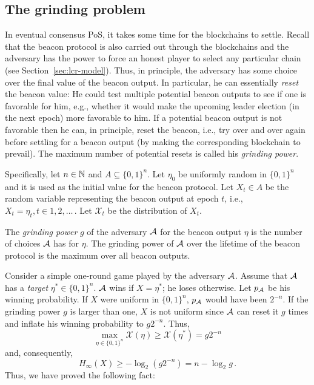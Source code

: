\subsection{The grinding problem}
In eventual consensus PoS, 
it takes some time for the blockchains to settle. 
Recall that the beacon protocol is also carried out through the blockchains 
and the adversary has the power to force an honest player 
to select any particular chain (see Section~\ref{sec:lcr-model}).
Thus, in principle, 
the adversary has some choice over the final value of the beacon output.
In particular, he can essentially \emph{reset} the beacon value: 
He could test multiple potential beacon outputs to see if one is favorable for him, 
e.g., whether it would make the upcoming leader election (in the next epoch) 
more favorable to him. 
If a potential beacon output is not favorable then he can, in principle, reset the beacon, 
i.e., try over and over again before settling for a beacon output 
(by making the corresponding blockchain to prevail). 
The maximum number of potential resets is called his \emph{grinding power}.

Specifically, let $n \in \mathbb{N}$ and $A \subseteq \{0,1\}^n$.
Let $\eta_0$ be uniformly random in $\{0,1\}^n$ 
and it is used as the initial value for the beacon protocol. 
Let $X_t \in A$ be the random variable 
representing the beacon output at epoch $t$, 
i.e., $X_t = \eta_t, t \in 1, 2, \ldots$\,. 
Let $\mathcal{X}_t$ be the distribution of $X_t$. 

\begin{definition}
The \emph{grinding power} $g$ of the adversary $\mathcal{A}$ 
for the beacon output $\eta$
is the number of choices $\mathcal{A}$ has for $\eta$. 
The grinding power of $\mathcal{A}$ over 
the lifetime of the beacon protocol
is the maximum over all beacon outputs.
\end{definition}

Consider a simple one-round game played by the adversary $\mathcal{A}$. 
Assume that $\mathcal{A}$ has a \emph{target} $\eta^* \in \{0,1\}^n$. 
$\mathcal{A}$ wins if $X = \eta^*$; he loses otherwise. 
Let $p_{\mathcal{A}}$ be his winning probability. 
If $X$ were uniform in $\{0,1\}^n$, 
$p_{\mathcal{A}}$ would have been $2^{-n}$. 
If the grinding power $g$ is larger than one, 
$X$ is not uniform since 
$\mathcal{A}$ can reset it $g$ times 
and inflate his winning probability to $g 2^{-n}$. 
Thus, 
$$ 
    \max_{\eta \in \{0,1\}^n} \mathcal{X}(\eta) \geq \mathcal{X}(\eta^*) = g 2^{-n}
$$ 
and, consequently, 
$$
    H_\infty(X) \geq -\log_2 (g 2^{-n}) = n - \log_2 g
    \,.
$$
Thus, we have proved the following fact:

